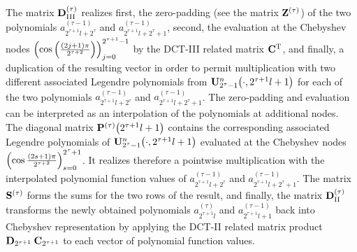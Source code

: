 The matrix $\mathbf{D}^{(\tau)}_{\text{III}}$ realizes 
first, the zero-padding (see the matrix $\mathbf{Z}^{(\tau)}$) of the two polynomials $a^{(\tau-1)}_{2^{\tau+1}l+2^{\tau}}$ and 
$a^{(\tau-1)}_{2^{\tau+1}l+2^{\tau}+1}$, second, the evaluation at the Chebyshev nodes 
$\left(\cos{\hspace{-0.4ex}}\left(\frac{(2j+1)\pi}{2^{\tau+2}}\right)\right)_{j=0}^{2^{\tau+1}-1}$ by the DCT-III related matrix 
$\mathbf{C}^{\text{\rm{T}}}$, and finally, a duplication of the resulting vector in order to permit multiplication with two different 
associated Legendre polynomials from $\mathbf{U}_{2^{\tau}-1}^{n}{\hspace{-0.4ex}}\left(\cdot,2^{\tau+1}l+1\right)$ for each of the 
two polynomials $a^{(\tau-1)}_{2^{\tau+1}l+2^{\tau}}$ and 
$a^{(\tau-1)}_{2^{\tau+1}l+2^{\tau}+1}$. The zero-padding and evaluation can be interpreted as an interpolation of the 
polynomials at additional nodes. The diagonal matrix $\mathbf{P}^{(\tau)}{\hspace{-0.4ex}}\left(2^{\tau+1}l+1\right)$ 
contains the corresponding associated Legendre polynomials of $\mathbf{U}_{2^{\tau}-1}^n{\hspace{-0.4ex}}\left(\cdot,2^{\tau+1}l+1\right)$ 
evaluated at the Chebyshev nodes $\left(\cos \frac{\left(2s+1\right)\pi}{2^{\tau+2}}\right)_{s=0}^{2^{\tau}+1}$. It realizes therefore 
a pointwise multiplication with the interpolated 
polynomial function values of $a^{(\tau-1)}_{2^{\tau+1}l+2^{\tau}}$ and $a^{(\tau-1)}_{2^{\tau+1}l+2^{\tau}+1}$. The matrix $\mathbf{S}^{(\tau)}$ 
forms the sums for the two rows of the result, and finally, the matrix $\mathbf{D}^{(\tau)}_{\text{II}}$ transforms the newly obtained 
polynomials $a^{(\tau)}_{2^{\tau+1}l}$ and $a^{(\tau-1)}_{2^{\tau+1}l+1}$ back into Chebyshev representation by applying the
DCT-II related matrix product $\mathbf{D}_{2^{\tau+1}} \: \mathbf{C}_{2^{\tau+1}}$ to each vector of polynomial function values.

